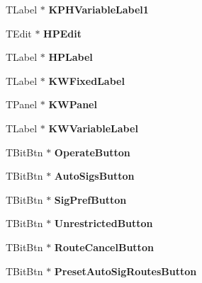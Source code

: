 \begin{DoxyCompactItemize}
T\+Label $\ast$ {\bfseries K\+P\+H\+Variable\+Label1}
\item 
\mbox{\label{class_t_interface_a887c2e4c504b5eb59b8afa33c6d34295}} 
T\+Edit $\ast$ {\bfseries H\+P\+Edit}
\item 
\mbox{\label{class_t_interface_a524da62de10424a79264bca256acbe2a}} 
T\+Label $\ast$ {\bfseries H\+P\+Label}
\item 
\mbox{\label{class_t_interface_a899968c38e121279dfd1fdd0f8a8ee41}} 
T\+Label $\ast$ {\bfseries K\+W\+Fixed\+Label}
\item 
\mbox{\label{class_t_interface_a66f500e3b3362042e12da9a2749f9fff}} 
T\+Panel $\ast$ {\bfseries K\+W\+Panel}
\item 
\mbox{\label{class_t_interface_a06ac8acc2e616f8b8c7026b4624bb858}} 
T\+Label $\ast$ {\bfseries K\+W\+Variable\+Label}
\item 
\mbox{\label{class_t_interface_a2dab1f7efbc4b609f97c28c3c28df5c9}} 
T\+Bit\+Btn $\ast$ {\bfseries Operate\+Button}
\item 
\mbox{\label{class_t_interface_a33594e732f59b3c3f838ace59177061c}} 
T\+Bit\+Btn $\ast$ {\bfseries Auto\+Sigs\+Button}
\item 
\mbox{\label{class_t_interface_a93e07f384754d76e4874436c2bb714e3}} 
T\+Bit\+Btn $\ast$ {\bfseries Sig\+Pref\+Button}
\item 
\mbox{\label{class_t_interface_a68ff82d32f0c984c9b186fae5d3a758d}} 
T\+Bit\+Btn $\ast$ {\bfseries Unrestricted\+Button}
\item 
\mbox{\label{class_t_interface_a3a1745cd5a327b9f5d518692b781ddc8}} 
T\+Bit\+Btn $\ast$ {\bfseries Route\+Cancel\+Button}
\item 
\mbox{\label{class_t_interface_a3d7c55fdfa676ee01f58b85b0e46de0a}} 
T\+Bit\+Btn $\ast$ {\bfseries Preset\+Auto\+Sig\+Routes\+Button}
\item 

\end{DoxyCompactItemize}
